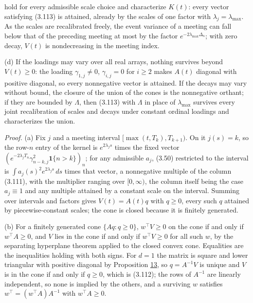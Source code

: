 \documentclass[11pt]{article}
\begin{document}
hold for every admissible scale choice and characterize \(K(t)\): every vector satisfying (3.113) is attained, already by the scales of one factor with \(\lambda_j = \lambda_{\max}\). As the scales are recalibrated freely, the event variance of a meeting can fall below that of the preceding meeting at most by the factor \(e^{-2\lambda_{\max} \Delta_n}\); with zero decay, \(V(t)\) is nondecreasing in the meeting index.

(d) If the loadings may vary over all real arrays, nothing survives beyond \(V(t) \ge 0\): the loading \(\gamma_{1,j} \ne 0\), \(\gamma_{i,j} = 0\) for \(i \ge 2\) makes \(A(t)\) diagonal with positive diagonal, so every nonnegative vector is attained. If the decays may vary without bound, the closure of the union of the cones is the nonnegative orthant; if they are bounded by \(\Lambda\), then (3.113) with \(\Lambda\) in place of \(\lambda_{\max}\) survives every joint recalibration of scales and decays under constant ordinal loadings and characterizes the union.

\emph{Proof.} (a) Fix \(j\) and a meeting interval \([\max(t, T_k), T_{k+1})\). On it \(j(s) = k\), so the row-\(n\) entry of the kernel is \(e^{2\lambda_j s}\) times the fixed vector \((e^{-2\lambda_j T_n} \gamma_{n-k,j}^2 \mathbf 1\{n > k\})_n\); for any admissible \(a_j\), (3.50) restricted to the interval is \(\int a_j(s)^2 e^{2\lambda_j s}\,ds\) times that vector, a nonnegative multiple of the column (3.111), with the multiplier ranging over \([0, \infty)\), the column itself being the case \(a_j \equiv 1\) and any multiple attained by a constant scale on the interval. Summing over intervals and factors gives \(V(t) = A(t) q\) with \(q \ge 0\), every such \(q\) attained by piecewise-constant scales; the cone is closed because it is finitely generated.

(b) For a finitely generated cone \(\{Aq : q \ge 0\}\), \(w^\top V \ge 0\) on the cone if and only if \(w^\top A \ge 0\), and \(V\) lies in the cone if and only if \(w^\top V \ge 0\) for all such \(w\), by the separating hyperplane theorem applied to the closed convex cone. Equalities are the inequalities holding with both signs. For \(d = 1\) the matrix is square and lower triangular with positive diagonal by Proposition \hyperref[res:Proposition-13]{13}, so \(q = A^{-1} V\) is unique and \(V\) is in the cone if and only if \(q \ge 0\), which is (3.112); the rows of \(A^{-1}\) are linearly independent, so none is implied by the others, and a surviving \(w\) satisfies \(w^\top = (w^\top A) A^{-1}\) with \(w^\top A \ge 0\).
\end{document}
